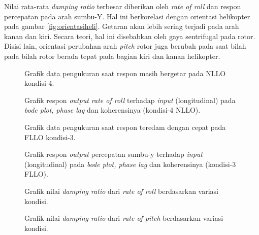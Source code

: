 Nilai rata-rata \textit{damping ratio} terbesar diberikan oleh \textit{rate of roll} dan respon percepatan pada arah sumbu-Y. Hal ini berkorelasi dengan orientasi helikopter pada gambar \ref{fig:orientasiheli}. Getaran akan lebih sering terjadi pada arah kanan dan kiri. Secara teori, hal ini disebabkan oleh gaya sentrifugal pada rotor. Disisi lain, orientasi perubahan arah \textit{pitch} rotor juga berubah pada saat bilah pada bilah rotor berada tepat pada bagian kiri dan kanan helikopter.

\begin{figure}[H]
	\centering
	\caption{Grafik data pengukuran saat respon masih bergetar pada NLLO kondisi-4.}
	\label{fig:NLLO-4}
\end{figure}

\begin{figure}[H]
	\centering
	\caption{Grafik respon \textit{output rate of roll} terhadap \textit{input} (longitudinal) pada \textit{bode plot, phase lag} dan koherensinya (kondisi-4 NLLO).}
	\label{fig:koheren-4_NLLO-4}
\end{figure}

\begin{figure}[H]
	\centering
	\caption{Grafik data pengukuran saat respon teredam dengan cepat pada FLLO kondisi-3.}
	\label{fig:FLLO-3_mark10}
\end{figure}

\begin{figure}[H]
	\centering
	\caption{Grafik respon \textit{output} percepatan sumbu-y terhadap \textit{input} (longitudinal) pada \textit{bode plot, phase lag} dan koherensinya (kondisi-3 FLLO).}
	\label{fig:koheren-3_FLLO}
\end{figure}



\begin{figure}[h]
	\centering
	\caption{Grafik nilai \textit{damping ratio} dari \textit{rate of roll} berdasarkan variasi kondisi.}
	\label{fig:plot_ROR}
\end{figure}

\begin{figure}[H]
	\centering
	\caption{Grafik nilai \textit{damping ratio} dari \textit{rate of pitch} berdasarkan variasi kondisi.}
	\label{fig:plot_ROP}
\end{figure}


